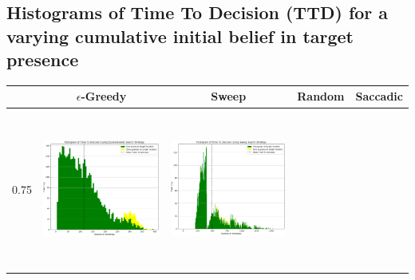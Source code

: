 \begin{landscape}
\section{Histograms of Time To Decision (TTD) for a varying cumulative initial belief in target presence}

\begin{table}[h!]
  \centering
  \begin{tabular}{ | c | c | c | c | c |}
    \hline
    & $\epsilon$-Greedy & Sweep & Random & Saccadic \\
    \hline
    0.75 & 
    \begin{minipage}[c][58mm][c]{48mm}
      \includegraphics[width=48mm, height=52mm]{Chapters/MultiAgentTargetDetection/Figs/Histograms/VaryingInitBelief/75/75EpsilonGreedyHistogram.png}
    \end{minipage}
    &
    \begin{minipage}[c][58mm][c]{48mm}
      \includegraphics[width=48mm, height=52mm]{Chapters/MultiAgentTargetDetection/Figs/Histograms/VaryingInitBelief/75/75SweepHistogram.png}


\end{minipage}
\end{tabular}
\end{table}
\end{landscape}
